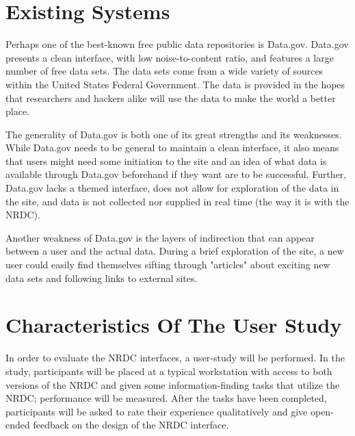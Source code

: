 \documentclass{article}
\begin{document}
%
%
\section{Existing Systems}
Perhaps one of the best-known free public data repositories is Data.gov. Data.gov presents a clean interface, with low noise-to-content ratio, and features a large number of free data sets. The data sets come from a wide variety of sources within the United States Federal Government. The data is provided in the hopes that researchers and hackers alike will use the data to make the world a better place\cite{data.gov}.

The generality of Data.gov is both one of its great strengths and its weaknesses. While Data.gov needs to be general to maintain a clean interface, it also means that users might need some initiation to the site and an idea of what data is available through Data.gov beforehand if they want are to be successful. Further, Data.gov lacks a themed interface, does not allow for exploration of the data in the site, and data is not collected nor supplied in real time (the way it is with the NRDC).

Another weakness of Data.gov is the layers of indirection that can appear between a user and the actual data. During a brief exploration of the site, a new user could easily find themselves sifting through "articles" about exciting new data sets and following links to external sites.


%
%
\section{Characteristics Of The User Study}
In order to evaluate the NRDC interfaces, a user-study will be performed. In the study, participants will be placed at a typical workstation with access to both versions of the NRDC and given some information-finding tasks that utilize the NRDC; performance will be measured. After the tasks have been completed, participants will be asked to rate their experience qualitatively and give open-ended feedback on the design of the NRDC interface\cite{dontmakemethink}\cite{information-and-web-services}.
\end{document}
